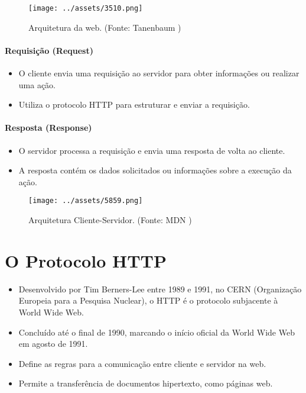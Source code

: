 \documentclass{article}
\begin{document}
\begin{figure}[h]
    \centering
    \texttt{[image: ../assets/3510.png]}
    \caption{Arquitetura da web. (Fonte: Tanenbaum \cite{tanenbaum})}
\end{figure}

\paragraph{Requisição (Request)}

\begin{itemize}
    \item O cliente envia uma requisição ao servidor para obter informações ou realizar uma ação.
    \item Utiliza o protocolo HTTP para estruturar e enviar a requisição.
\end{itemize}

\paragraph{Resposta (Response)}

\begin{itemize}
    \item O servidor processa a requisição e envia uma resposta de volta ao cliente.
    \item A resposta contém os dados solicitados ou informações sobre a execução da ação.
\end{itemize}

\begin{figure}[h]
    \centering
    \texttt{[image: ../assets/5859.png]}
    \caption{Arquitetura Cliente-Servidor. (Fonte: MDN \cite{mdn})}
\end{figure}

\section{O Protocolo HTTP}

\begin{itemize}
    \item Desenvolvido por Tim Berners-Lee entre 1989 e 1991, no CERN (Organização Europeia para a Pesquisa Nuclear), o HTTP é o protocolo subjacente à World Wide Web.
    \item Concluído até o final de 1990, marcando o início oficial da World Wide Web em agosto de 1991.
    \item Define as regras para a comunicação entre cliente e servidor na web.
    \item Permite a transferência de documentos hipertexto, como páginas web.
\end{itemize}
\end{document}
